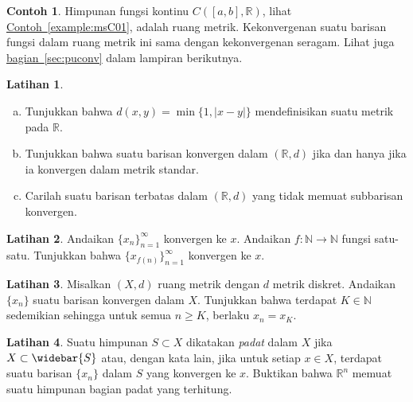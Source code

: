 \documentclass[12pt,openany]{book}
\newcommand{\sabs}[1]{\lvert {#1} \rvert}
\newcommand{\R}{{\mathbb{R}}}
\newcommand{\N}{{\mathbb{N}}}
\theoremstyle{plain}
\theoremstyle{remark}
\theoremstyle{definition}
\newenvironment{exbox}{%
    \def\FrameCommand{\vrule width 1pt \relax\hspace{10pt}}%
    \MakeFramed{\advance\hsize-\width\FrameRestore}%
}{%
    \endMakeFramed
}
\newenvironment{exparts}{%
    \leavevmode\begin{enumerate}[a),noitemsep,topsep=0pt,parsep=0pt,partopsep=0pt]
}{%
    \end{enumerate}
}
\theoremstyle{exercise}
\newtheorem{exercise}{Latihan}[section]
\theoremstyle{example}
\newtheorem{example}[thm]{Contoh}
\newcommand{\sectionref}[1]{\hyperref[#1]{bagian~\ref*{#1}}}
\newcommand{\exampleref}[1]{\hyperref[#1]{Contoh~\ref*{#1}}}
\begin{document}
\begin{example}
Himpunan fungsi kontinu $C([a,b],\R)$, lihat \exampleref{example:msC01},
adalah ruang metrik. Kekonvergenan suatu barisan fungsi
dalam ruang metrik ini sama dengan kekonvergenan seragam. Lihat juga
\sectionref{sec:puconv} dalam lampiran berikutnya.
\end{example}

\begin{exbox}
\begin{exercise}
\begin{exparts}
\item
Tunjukkan bahwa $d(x,y) = \min \bigl\{ 1, \sabs{x-y} \bigr\}$ mendefinisikan suatu metrik pada $\R$.
\item
Tunjukkan bahwa suatu barisan konvergen dalam $(\R,d)$ jika dan hanya jika ia konvergen
dalam metrik standar.
\item
Carilah suatu barisan terbatas dalam $(\R,d)$ yang
tidak memuat subbarisan konvergen.
\end{exparts}
\end{exercise}

\begin{exercise}
Andaikan $\{x_n\}_{n=1}^\infty$ konvergen ke $x$. Andaikan $f \colon \N
\to \N$ fungsi satu-satu. Tunjukkan bahwa
$\{ x_{f(n)} \}_{n=1}^\infty$ konvergen ke $x$.
\end{exercise}

\begin{exercise}
Misalkan $(X,d)$ ruang metrik dengan $d$ metrik diskret. Andaikan
$\{ x_n \}$ suatu barisan konvergen dalam $X$. Tunjukkan bahwa terdapat
$K \in \N$ sedemikian sehingga untuk semua $n \geq K$, berlaku $x_n = x_K$.
\end{exercise}

\begin{exercise}
Suatu himpunan $S \subset X$ dikatakan \emph{padat} dalam $X$ jika
$X \subset \widebar{S}$ atau, dengan kata lain, jika untuk setiap $x \in X$,
terdapat suatu barisan $\{ x_n \}$ dalam $S$ yang konvergen ke $x$. Buktikan
bahwa $\R^n$ memuat suatu himpunan bagian padat yang terhitung.
\end{exercise}


\end{exbox}
\end{document}

